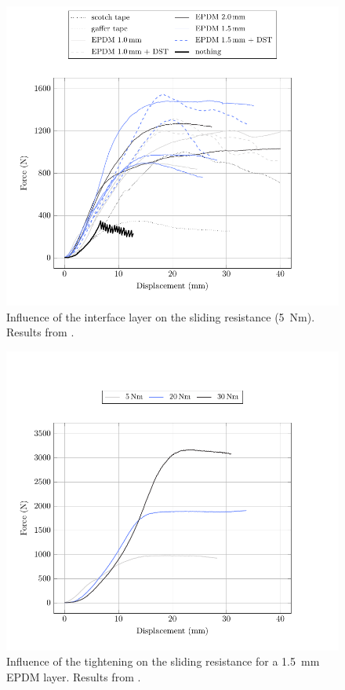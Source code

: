 \begin{figure}[p]
\centering
\begin{fullpage}
	\includegraphics[]{ch2_creteil/plot/1_layer_benchmark/build.pdf}
	\caption[Influence of the interface layer on the sliding resistance]{Influence of the interface layer on the sliding resistance (\SI{5}{Nm}). Results from \cite{Tayeb2015a}.}
	\label{plot:layer_benchmark}
\end{fullpage}
\end{figure}

\begin{figure}[p]
\centering
\begin{fullpage}
	\includegraphics[]{ch2_creteil/plot/3_tightening/build.pdf}
	\caption[Influence of the tightening on the sliding resistance]{Influence of the tightening on the sliding resistance for a \SI{1.5}{\mm} EPDM layer. Results from \cite{Tayeb2015a}.}
	\label{plot:tightening}
\end{fullpage}
\end{figure}

